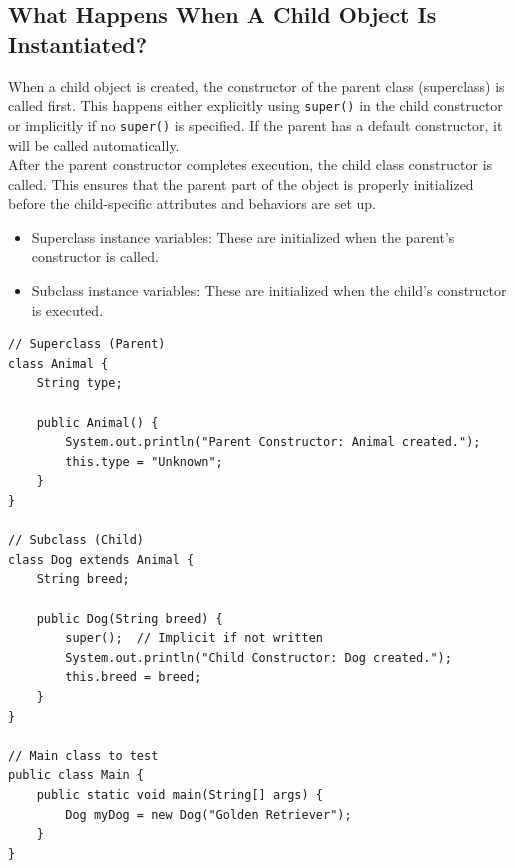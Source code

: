 \documentclass[letterpaper,12pt]{article}
\begin{document}
\subsection{What Happens When A Child Object Is Instantiated?}
When a child object is created, the constructor of the parent class (superclass) is called first. This happens either explicitly using \texttt{super()} in the child constructor or implicitly if no \texttt{super()} is specified. If the parent has a default constructor, it will be called automatically.\\
After the parent constructor completes execution, the child class constructor is called. This ensures that the parent part of the object is properly initialized before the child-specific attributes and behaviors are set up.
\begin{itemize}
    \item Superclass instance variables: These are initialized when the parent’s constructor is called.
    \item Subclass instance variables: These are initialized when the child’s constructor is executed.
\end{itemize}
\begin{verbatim}
// Superclass (Parent)
class Animal {
    String type;

    public Animal() {
        System.out.println("Parent Constructor: Animal created.");
        this.type = "Unknown";
    }
}

// Subclass (Child)
class Dog extends Animal {
    String breed;

    public Dog(String breed) {
        super();  // Implicit if not written
        System.out.println("Child Constructor: Dog created.");
        this.breed = breed;
    }
}

// Main class to test
public class Main {
    public static void main(String[] args) {
        Dog myDog = new Dog("Golden Retriever");
    }
}
\end{verbatim}
\end{document}
